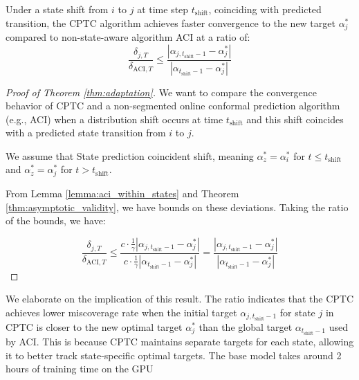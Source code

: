 \begin{theorem*}
Under a state shift from $i$ to $j$ at time step $t_{\text{shift}}$, coinciding with predicted transition, the CPTC algorithm achieves faster convergence to the new target $\alpha^*_{j}$ compared to non-state-aware algorithm ACI at a ratio of:
\[
\frac{\delta_{j,T}}{\delta_{\text{ACI},T}} \leq \frac{|\alpha_{j, t_{\text{shift}}-1}  - \alpha^{*}_{j}|}{|\alpha_{ t_{\text{shift}}-1} - \alpha^{*}_{j}|}
\]
\end{theorem*}

\begin{proof}[Proof of Theorem \ref{thm:adaptation}]

We want to compare the convergence behavior of CPTC and a non-segmented online conformal prediction algorithm (e.g., ACI) when a distribution shift occurs at time $t_{\text{shift}}$ and this shift coincides with a predicted state transition from $i$ to $j$. 

We assume that State prediction coincident shift, meaning $\alpha_z^* = \alpha_i^*$ for $t\leq t_{\text{shift}}$ and $\alpha_z^* = \alpha^*_j$ for $t> t_{\text{shift}}$.


From Lemma \ref{lemma:aci_within_states} and Theorem \ref{thm:asymptotic_validity}, we have bounds on these deviations. Taking the ratio of the bounds, we have:

\[
\frac{\delta_{j,T}}{\delta_{\text{ACI},T}} \leq \frac{c \cdot \frac{1}{\gamma} |\alpha_{j, t_{\text{shift}}-1}  - \alpha^{*}_{j}|}{c \cdot \frac{1}{\gamma} |\alpha_{ t_{\text{shift}}-1} - \alpha^{*}_{j}|} =  \frac{|\alpha_{j, t_{\text{shift}}-1}  - \alpha^{*}_{j}|}{|\alpha_{ t_{\text{shift}}-1} - \alpha^{*}_{j}|}
\]


\end{proof}

We elaborate on the implication of this result. The ratio indicates that the CPTC achieves lower miscoverage rate when the initial target $\alpha_{j, t_{\text{shift}}-1}$ for state $j$ in CPTC is closer to the new optimal target $\alpha^*_j$ than the global target $\alpha_{t_{\text{shift}}-1}$ used by ACI. This is because CPTC maintains separate targets for each state, allowing it to better track state-specific optimal targets. The base model takes around 2 hours of training time on the GPU 




